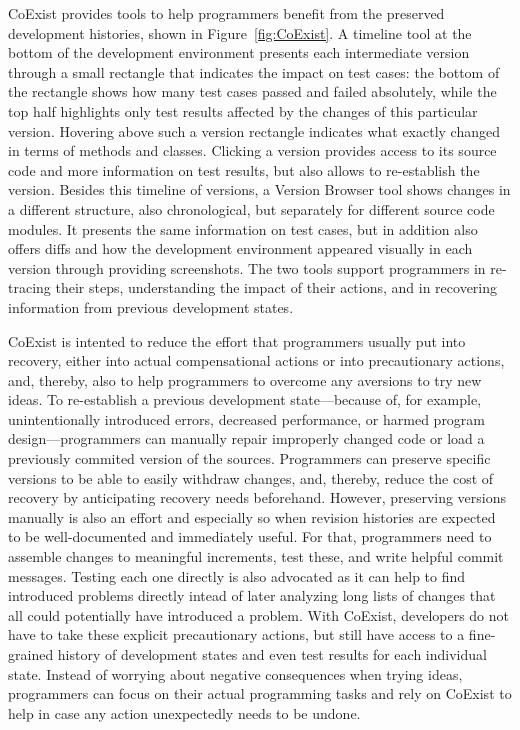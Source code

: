 CoExist provides tools to help programmers benefit from the preserved development histories, shown in Figure~\ref{fig:CoExist}.
A timeline tool at the bottom of the development environment presents each intermediate version through a small rectangle that indicates the impact on test cases: the bottom of the rectangle shows how many test cases passed and failed absolutely, while the top half highlights only test results affected by the changes of this particular version.
Hovering above such a version rectangle indicates what exactly changed in terms of methods and classes.
Clicking a version provides access to its source code and more information on test results, but also allows to re-establish the version.
Besides this timeline of versions, a Version Browser tool shows changes in a different structure, also chronological, but separately for different source code modules.
It presents the same information on test cases, but in addition also offers diffs and how the development environment appeared visually in each version through providing screenshots.
The two tools support programmers in re-tracing their steps, understanding the impact of their actions, and in recovering information from previous development states.

CoExist is intented to reduce the effort that programmers usually put into recovery, either into actual compensational actions or into precautionary actions, and, thereby, also to help programmers to overcome any aversions to try new ideas.
To re-establish a previous development state---because of, for example, unintentionally introduced errors, decreased performance, or harmed program design---programmers can manually repair improperly changed code or load a previously commited version of the sources.
Programmers can preserve specific versions to be able to easily withdraw changes, and, thereby, reduce the cost of recovery by anticipating recovery needs beforehand.
However, preserving versions manually is also an effort and especially so when revision histories are expected to be well-documented and immediately useful.
For that, programmers need to assemble changes to meaningful increments, test these, and write helpful commit messages.
Testing each one directly is also advocated as it can help to find introduced problems directly intead of later analyzing long lists of changes that all could potentially have introduced a problem.
With CoExist, developers do not have to take these explicit precautionary actions, but still have access to a fine-grained history of development states and even test results for each individual state.
Instead of worrying about negative consequences when trying ideas, programmers can focus on their actual programming tasks and rely on CoExist to help in case any action unexpectedly needs to be undone.


